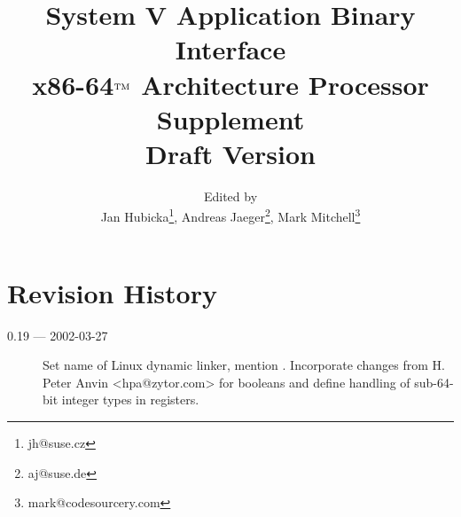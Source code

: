 \documentclass[12pt]{report}
\begin{document}
\author{Edited by\\
  Jan Hubicka\thanks{jh@suse.cz}, Andreas Jaeger\thanks{aj@suse.de},
  Mark Mitchell\thanks{mark@codesourcery.com}}

\title{System V Application Binary Interface\\
{\Large x86-64$^{\rm TM}$ Architecture Processor Supplement\\
Draft Version \version}}
\maketitle
\tableofcontents
\listoftables
\listoffigures

\section*{Revision History}

\begin{description}
\item[0.19 --- 2002-03-27] Set name of Linux dynamic linker, mention
  .
  Incorporate changes from H. Peter Anvin <hpa@zytor.com>
  for booleans and define handling of sub-64-bit integer types in
  registers.
\end{description}











\appendix


\end{document}

